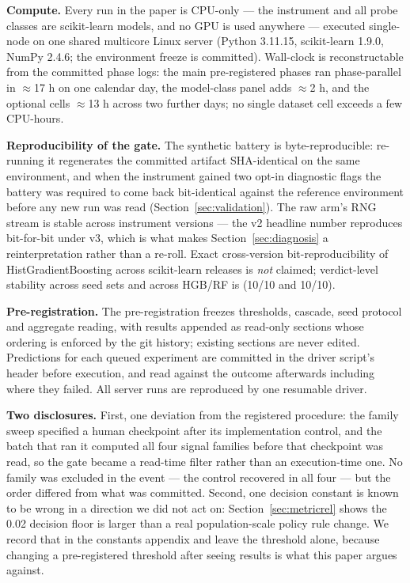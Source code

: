 \documentclass[10pt]{article} %
\begin{document}
\textbf{Compute.} Every run in the paper is CPU-only --- the instrument and all probe classes are
scikit-learn models, and no GPU is used anywhere --- executed single-node on one shared multicore
Linux server (Python 3.11.15, scikit-learn 1.9.0, NumPy 2.4.6; the environment freeze is committed).
Wall-clock is reconstructable from the committed phase logs: the main pre-registered phases ran
phase-parallel in $\approx$17 h on one calendar day, the model-class panel adds $\approx$2 h, and the optional cells
$\approx$13 h across two further days; no single dataset cell exceeds a few CPU-hours.

\textbf{Reproducibility of the gate.} The synthetic battery is byte-reproducible: re-running it
regenerates the committed artifact SHA-identical on the same environment, and when the instrument
gained two opt-in diagnostic flags the battery was required to come back bit-identical against the
reference environment before any new run was read (Section~\ref{sec:validation}). The raw arm's RNG stream is stable across
instrument versions --- the v2 headline number reproduces bit-for-bit under v3, which is what makes
Section~\ref{sec:diagnosis} a reinterpretation rather than a re-roll. Exact cross-version bit-reproducibility of
HistGradientBoosting across scikit-learn releases is \emph{not} claimed; verdict-level stability across
seed sets and across HGB/RF is (10/10 and 10/10).

\textbf{Pre-registration.} The pre-registration freezes thresholds, cascade, seed protocol and aggregate
reading, with results appended as read-only sections whose ordering is enforced by the git history;
existing sections are never edited. Predictions for each queued experiment are committed in the
driver script's header before execution, and read against the outcome afterwards including where
they failed. All server runs are reproduced by one resumable driver.

\textbf{Two disclosures.} First, one deviation from the registered procedure: the family sweep specified
a human checkpoint after its implementation control, and the batch that ran it computed all four
signal families before that checkpoint was read, so the gate became a read-time filter rather than
an execution-time one. No family was excluded in the event --- the control recovered in all four ---
but the order differed from what was committed. Second, one decision constant is known to be wrong
in a direction we did not act on: Section~\ref{sec:metricrel} shows the 0.02 decision floor is larger than a real
population-scale policy rule change. We record that in the constants appendix and leave the
threshold alone, because changing a pre-registered threshold after seeing results is what this
paper argues against.
\end{document}
